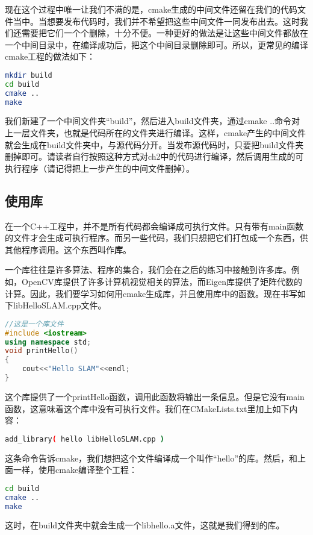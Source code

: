 现在这个过程中唯一让我们不满的是，cmake生成的中间文件还留在我们的代码文件当中。当想要发布代码时，我们并不希望把这些中间文件一同发布出去。这时我们还需要把它们一个个删除，十分不便。一种更好的做法是让这些中间文件都放在一个中间目录中，在编译成功后，把这个中间目录删除即可。所以，更常见的编译cmake工程的做法如下：

\begin{lstlisting}[language=sh]
mkdir build
cd build
cmake ..
make
\end{lstlisting}

我们新建了一个中间文件夹“build”，然后进入build文件夹，通过cmake ..命令对上一层文件夹，也就是代码所在的文件夹进行编译。这样，cmake产生的中间文件就会生成在build文件夹中，与源代码分开。当发布源代码时，只要把build文件夹删掉即可。请读者自行按照这种方式对ch2中的代码进行编译，然后调用生成的可执行程序（请记得把上一步产生的中间文件删掉）。

\subsection{使用库}
在一个C++工程中，并不是所有代码都会编译成可执行文件。只有带有main函数的文件才会生成可执行程序。而另一些代码，我们只想把它们打包成一个东西，供其他程序调用。这个东西叫作\textbf{库}。

一个库往往是许多算法、程序的集合，我们会在之后的练习中接触到许多库。例如，OpenCV库提供了许多计算机视觉相关的算法，而Eigen库提供了矩阵代数的计算。因此，我们要学习如何用cmake生成库，并且使用库中的函数。现在书写如下libHelloSLAM.cpp文件。

\begin{lstlisting}[language=c++,caption=slambook/ch2/libHelloSLAM.cpp]
//这是一个库文件
#include <iostream>
using namespace std;
void printHello()
{
	cout<<"Hello SLAM"<<endl;
}
\end{lstlisting}

这个库提供了一个printHello函数，调用此函数将输出一条信息。但是它没有main函数，这意味着这个库中没有可执行文件。我们在CMakeLists.txt里加上如下内容：
\begin{lstlisting}[language=sh]
add_library( hello libHelloSLAM.cpp )
\end{lstlisting}

这条命令告诉cmake，我们想把这个文件编译成一个叫作“hello”的库。然后，和上面一样，使用cmake编译整个工程：
\begin{lstlisting}[language=sh]
cd build
cmake ..
make
\end{lstlisting}
这时，在build文件夹中就会生成一个libhello.a文件，这就是我们得到的库。

